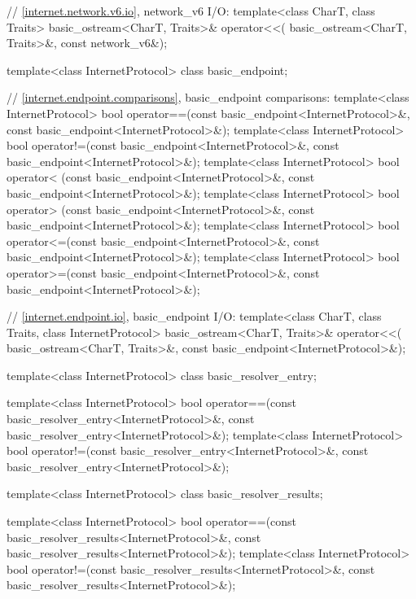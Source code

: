\begin{codeblock}
{{{{  // \ref{internet.network.v6.io}, network_v6 I/O:
  template<class CharT, class Traits>
    basic_ostream<CharT, Traits>& operator<<(
      basic_ostream<CharT, Traits>&, const network_v6&);

  template<class InternetProtocol>
    class basic_endpoint;

  // \ref{internet.endpoint.comparisons}, basic_endpoint comparisons:
  template<class InternetProtocol>
    bool operator==(const basic_endpoint<InternetProtocol>&,
                    const basic_endpoint<InternetProtocol>&);
  template<class InternetProtocol>
    bool operator!=(const basic_endpoint<InternetProtocol>&,
                    const basic_endpoint<InternetProtocol>&);
  template<class InternetProtocol>
    bool operator< (const basic_endpoint<InternetProtocol>&,
                    const basic_endpoint<InternetProtocol>&);
  template<class InternetProtocol>
    bool operator> (const basic_endpoint<InternetProtocol>&,
                    const basic_endpoint<InternetProtocol>&);
  template<class InternetProtocol>
    bool operator<=(const basic_endpoint<InternetProtocol>&,
                    const basic_endpoint<InternetProtocol>&);
  template<class InternetProtocol>
    bool operator>=(const basic_endpoint<InternetProtocol>&,
                    const basic_endpoint<InternetProtocol>&);

  // \ref{internet.endpoint.io}, basic_endpoint I/O:
  template<class CharT, class Traits, class InternetProtocol>
    basic_ostream<CharT, Traits>& operator<<(
      basic_ostream<CharT, Traits>&,
      const basic_endpoint<InternetProtocol>&);

  template<class InternetProtocol>
    class basic_resolver_entry;

  template<class InternetProtocol>
    bool operator==(const basic_resolver_entry<InternetProtocol>&,
                    const basic_resolver_entry<InternetProtocol>&);
  template<class InternetProtocol>
    bool operator!=(const basic_resolver_entry<InternetProtocol>&,
                    const basic_resolver_entry<InternetProtocol>&);

  template<class InternetProtocol>
    class basic_resolver_results;

  template<class InternetProtocol>
    bool operator==(const basic_resolver_results<InternetProtocol>&,
                    const basic_resolver_results<InternetProtocol>&);
  template<class InternetProtocol>
    bool operator!=(const basic_resolver_results<InternetProtocol>&,
                    const basic_resolver_results<InternetProtocol>&);

}}}}
\end{codeblock}
